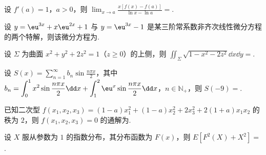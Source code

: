 \begin{question}[index=11]
设 $f'(a)=1$，$a>0$，则 $\displaystyle\lim_{x\to a}\frac{x[f(x)-f(a)]}{\ln x-\ln a}=$\fillin.
\end{question}
\QuestionBreak

\begin{question}[index=12]
设 $y=\eu^{3x}+x\eu^{2x}+1$ 与 $y=\eu^{3x}-1$ 是某三阶常系数非齐次线性微分方程的两个特解，则该微分方程为\fillin.
\end{question}
\QuestionBreak

\begin{question}[index=13]
设 $\Sigma$ 为曲面 $x^2+y^2+2z^2=1$（$z\ge0$）的上侧，则 $\displaystyle\iint_\Sigma\sqrt{1-x^2-2z^2}\dd x\dd y=$\fillin.
\end{question}
\QuestionBreak

\begin{question}[index=14]
设 $\displaystyle S(x)=\sum_{n=1}^\infty b_n\sin\frac{n\pi x}2$，其中 $\displaystyle b_n=\int_0^1x^2\sin\frac{n\pi x}2\dd x+\int_1^2\eu^x\sin\frac{n\pi x}2\dd x$，$n\in\mathbb N_+$，则 $S(-9)=$\fillin.
\end{question}
\QuestionBreak

\begin{question}[index=15]
已知二次型 $f(x_1,x_2,x_3)=(1-a)x_1^2+(1-a)x_2^2+2x_3^2+2(1+a)x_1x_2$ 的秩为 $2$，则 $f(x_1,x_2,x_3)=0$ 的通解为\fillin.
\end{question}
\QuestionBreak

\begin{question}[index=16]
设 $X$ 服从参数为 $1$ 的指数分布，其分布函数为 $F(x)$，则 $E[F^2(X)+X^2]=$\fillin.
\end{question}
